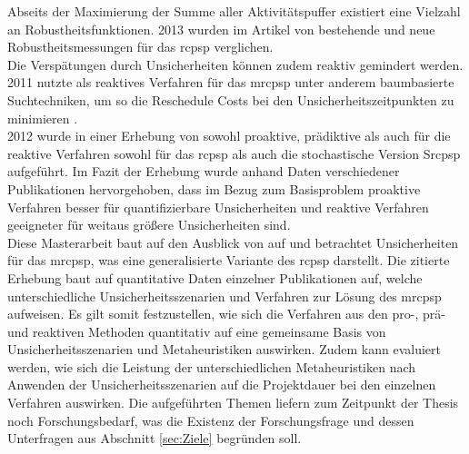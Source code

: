 Abseits der Maximierung der Summe aller Aktivitätspuffer existiert eine Vielzahl an Robustheitsfunktionen. 2013 wurden im Artikel von \cite{khemakhem_efficient_2013} bestehende und neue Robustheitsmessungen für das \ac{rcpsp} verglichen. \\

Die Verspätungen durch Unsicherheiten können zudem reaktiv gemindert werden. 2011 nutzte \cite{deblaere_reactive_2011} als reaktives Verfahren für das \ac{mrcpsp} unter anderem baumbasierte Suchtechniken, um so die Reschedule Costs bei den Unsicherheitszeitpunkten zu minimieren \cite[vgl.][S. 66]{deblaere_reactive_2011}. \\

2012 wurde in einer Erhebung von \cite{brcic_resource_2012} sowohl proaktive, prädiktive als auch für die reaktive Verfahren sowohl für das \ac{rcpsp} als auch die stochastische Version S\ac{rcpsp} aufgeführt. Im Fazit der Erhebung wurde anhand Daten verschiedener Publikationen hervorgehoben, dass im Bezug zum Basisproblem proaktive Verfahren besser für quantifizierbare Unsicherheiten und reaktive Verfahren geeigneter für weitaus größere Unsicherheiten sind. \\

Diese Masterarbeit baut auf den Ausblick von \cite[S. 405 f.]{brcic_resource_2012} auf und betrachtet Unsicherheiten für das \ac{mrcpsp}, was eine generalisierte Variante des \ac{rcpsp} darstellt. Die zitierte Erhebung baut auf quantitative Daten einzelner Publikationen auf, welche unterschiedliche Unsicherheitsszenarien und Verfahren zur Lösung des \ac{mrcpsp} aufweisen. Es gilt somit festzustellen, wie sich die Verfahren aus den pro-, prä- und reaktiven Methoden quantitativ auf eine gemeinsame Basis von Unsicherheitsszenarien und Metaheuristiken auswirken. Zudem kann evaluiert werden, wie sich die Leistung der unterschiedlichen Metaheuristiken nach Anwenden der Unsicherheitsszenarien auf die Projektdauer bei den einzelnen Verfahren auswirken. Die aufgeführten Themen liefern zum Zeitpunkt der Thesis noch Forschungsbedarf, was die Existenz der Forschungsfrage und dessen Unterfragen aus Abschnitt \ref{sec:Ziele} begründen soll. 

